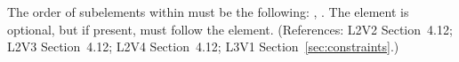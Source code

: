 The order of subelements within \Constraint must be the following:
, .  The  element is optional,
but if present, must follow the  element.  (References: L2V2
Section~4.12; L2V3 Section~4.12; L2V4 Section~4.12; L3V1 Section~\ref{sec:constraints}.)
